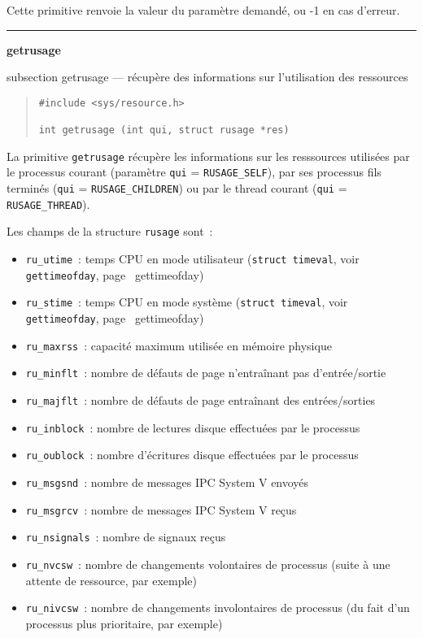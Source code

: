 \documentclass [twoside] {report}
\newcommand {\primitive} [1]
    {
	\phantomsection
	{\large \textbf {#1}}
	\addcontentsline {toc} {subsection} {#1}
    }
\newcommand {\separation}
    {
	\vspace {5mm}
	\nopagebreak
	\hrule
    }
\begin{document}
Cette primitive renvoie la valeur du paramètre demandé,
ou -1 en cas d'erreur.



\separation
\primitive {getrusage} --- récupère des informations sur l'utilisation des ressources
    \label {getrusage}

\begin {quote}
\begin {verbatim}
#include <sys/resource.h>

int getrusage (int qui, struct rusage *res)
\end{verbatim}
\end {quote}

La primitive \texttt {getrusage} récupère les informations sur les
resssources utilisées par le processus courant (paramètre \texttt {qui}
= \texttt {RUSAGE\_SELF}), par ses processus fils terminés (\texttt {qui}
= \texttt {RUSAGE\_CHILDREN}) ou par le thread courant (\texttt {qui}
= \texttt {RUSAGE\_THREAD}).

Les champs de la structure \texttt {rusage} sont~:

\begin {itemize}
    \item \texttt {ru\_utime}~: temps CPU en mode utilisateur (\texttt
	{struct timeval}, voir \texttt {gettimeofday}, page~\pageref
	{gettimeofday})
    \item \texttt {ru\_stime}~: temps CPU en mode système (\texttt
	{struct timeval}, voir \texttt {gettimeofday}, page~\pageref
	{gettimeofday})
    \item \texttt {ru\_maxrss}~: capacité maximum utilisée en mémoire
	physique
    \item \texttt {ru\_minflt}~: nombre de défauts de page n'entraînant
	pas d'entrée/sortie
    \item \texttt {ru\_majflt}~: nombre de défauts de page entraînant
	des entrées/sorties
    \item \texttt {ru\_inblock}~: nombre de lectures disque effectuées
	par le processus
    \item \texttt {ru\_oublock}~: nombre d'écritures disque effectuées
	par le processus
    \item \texttt {ru\_msgsnd}~: nombre de messages IPC System V envoyés
    \item \texttt {ru\_msgrcv}~: nombre de messages IPC System V reçus
    \item \texttt {ru\_nsignals}~: nombre de signaux reçus \item \texttt
    {ru\_nvcsw}~: nombre de changements volontaires de
	processus (suite à une attente de ressource, par exemple)
    \item \texttt {ru\_nivcsw}~: nombre de changements involontaires
	de processus (du fait d'un processus plus prioritaire, par
	exemple)

\end {itemize}
\end{document}
